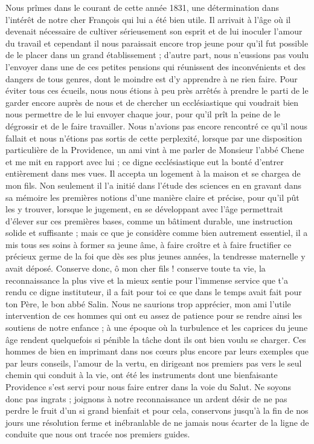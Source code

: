 \documentclass[11pt,a4paper]{report}
\begin{document}
Nous prîmes dans le courant de cette année 1831, une détermination dans l'intérêt de notre cher François qui lui a été bien utile. Il arrivait à l'âge où il devenait nécessaire de cultiver sérieusement son esprit et de lui inoculer l'amour du travail et cependant il nous paraissait encore trop jeune pour qu'il fut possible de le placer dans un grand établissement ; d'autre part, nous n'eussions pas voulu l'envoyer dans une de ces petites pensions qui réunissent des inconvénients et des dangers de tous genres, dont le moindre est d'y apprendre à ne rien faire. Pour éviter tous ces écueils, nous nous étions à peu près arrêtés à prendre le parti de le garder encore auprès de nous et de chercher un ecclésiastique qui voudrait bien nous permettre de le lui envoyer chaque jour, pour qu'il prît la peine de le dégrossir et de le faire travailler. Nous n'avions pas encore rencontré ce qu'il nous fallait et nous n'étions pas sortis de cette perplexité, lorsque par une disposition particulière de la Providence, un ami vint à me parler de Monsieur l'abbé Chene et me mit en rapport avec lui ; ce digne ecclésiastique eut la bonté d'entrer entièrement dans mes vues. Il accepta un logement à la maison et se chargea de mon fils. Non seulement il l'a initié dans l'étude des sciences en en gravant dans sa mémoire les premières notions d'une manière claire et précise, pour qu'il pût les y trouver, lorsque le jugement, en se développant avec l'âge permettrait d'élever sur ces premières bases, comme un bâtiment durable, une instruction solide et suffisante ; mais ce que je considère comme bien autrement essentiel, il a mis tous ses soins à former sa jeune âme, à faire croître et à faire fructifier ce précieux germe de la foi que dès ses plus jeunes années, la tendresse maternelle y avait déposé. Conserve donc, ô mon cher fils ! conserve toute ta vie, la reconnaissance la plus vive et la mieux sentie pour l'immense service que t'a rendu ce digne instituteur, il a fait pour toi ce que dans le temps avait fait pour ton Père, le bon abbé Salin. Nous ne saurions trop apprécier, mon ami l'utile intervention de ces hommes qui ont eu assez de patience pour se rendre ainsi les soutiens de notre enfance ; à une époque où la turbulence et les caprices du jeune âge rendent quelquefois si pénible la tâche dont ils ont bien voulu se charger. Ces hommes de bien en imprimant dans nos cœurs plus encore par leurs exemples que par leurs conseils, l'amour de la vertu, en dirigeant nos premiers pas vers le seul chemin qui conduit à la vie, ont été les instruments dont une bienfaisante Providence s'est servi pour nous faire entrer dans la voie du Salut. Ne soyons donc pas ingrats ; joignons à notre reconnaissance un ardent désir de ne pas perdre le fruit d'un si grand bienfait et pour cela, conservons jusqu'à la fin de nos jours une résolution ferme et inébranlable de ne jamais nous écarter de la ligne de conduite que nous ont tracée nos premiers guides.
\end{document}

